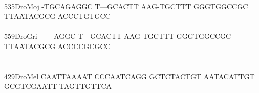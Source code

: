 \documentclass[11pt,twoside,reqno,a4paper]{article}
\begin{document}
{\hspace*{4\charwidth}\hspace*{7\charwidth}\hspace*{1\charwidth}\hspace*{1\charwidth}\hspace*{1\charwidth}\hspace*{1\charwidth}\hspace*{1\charwidth}\hspace*{1\charwidth}\\
535\hspace*{1\charwidth}DroMoj	-TGCAGAGGC	T---GCACTT	AAG-TGCTTT	GGGTGGCCGC	TTAATACGCG	ACCCTGTGCC	\\
\hspace*{4\charwidth}\hspace*{7\charwidth}\hspace*{1\charwidth}\hspace*{1\charwidth}\hspace*{1\charwidth}\hspace*{1\charwidth}\hspace*{1\charwidth}\hspace*{1\charwidth}\\
559\hspace*{1\charwidth}DroGri	------AGGC	T---GCACTT	AAG-TGCTTT	GGGTGGCCGC	TTAATACGCG	ACCCCGCGCC	\\
\hspace*{4\charwidth}\hspace*{7\charwidth}\hspace*{1\charwidth}\hspace*{1\charwidth}\hspace*{1\charwidth}\hspace*{1\charwidth}\hspace*{1\charwidth}\hspace*{1\charwidth}\\
\\
429\hspace*{1\charwidth}DroMel	CAATTAAAAT	CCCAATCAGG	GCTCTACTGT	AATACATTGT	GCGTCGAATT	TAGTTGTTCA	\\
\hspace*{4\charwidth}\hspace*{7\charwidth}\hspace*{1\charwidth}\hspace*{1\charwidth}\hspace*{1\charwidth}\hspace*{1\charwidth}\hspace*{1\charwidth}\hspace*{1\charwidth}\\
}
\end{document}
